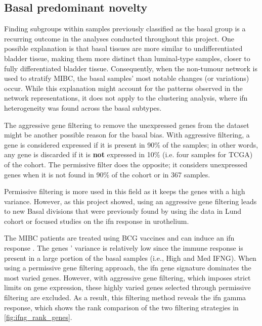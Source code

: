 \subsection*{Basal predominant novelty} \label{s:discussion:gene_filt}

Finding subgroups within samples previously classified as the basal group is a recurring outcome in the analyses conducted throughout this project. One possible explanation is that basal tissues are more similar to undifferentiated bladder tissue, making them more distinct than luminal-type samples, closer to fully differentiated bladder tissue. Consequently, when the non-tumour network is used to stratify MIBC, the basal samples' most notable changes (or variations) occur. While this explanation might account for the patterns observed in the network representations, it does not apply to the clustering analysis, where \acrshort{ifn} heterogeneity was found across the basal subtypes.

The aggressive gene filtering to remove the unexpressed genes from the dataset might be another possible reason for the basal bias. With aggressive filtering, a gene is considered expressed if it is present in 90\% of the samples; in other words, any gene is discarded if it is \textbf{not} expressed in 10\% (i.e. four samples for TCGA) of the cohort. The permissive filter does the opposite; it considers unexpressed genes when it is not found in 90\% of the cohort or in 367 samples. 

Permissive filtering is more used in this field as it keeps the genes with a high variance. However, as this project showed, using an aggressive gene filtering leads to new Basal divisions that were previously found by using \acrshort{ihc} data in Lund cohort \citep{Marzouka2018-ge} or focused studies on the \acrshort{ifn} response in urothelium.

The MIBC patients are treated using BCG vaccines and can induce an \acrshort{ifn} response \citep{Baker2022-bj}. The genes ' variance is relatively low since the immune response is present in a large portion of the basal samples (i.e., High and Med IFNG). When using a permissive gene filtering approach, the \acrshort{ifn} gene signature dominates the most varied genes. However, with aggressive gene filtering, which imposes strict limits on gene expression, these highly varied genes selected through permissive filtering are excluded. As a result, this filtering method reveals the \acrlong{ifn} gamma response, which shows the rank comparison of the two filtering strategies in \cref{fig:ifng_rank_genes}.

